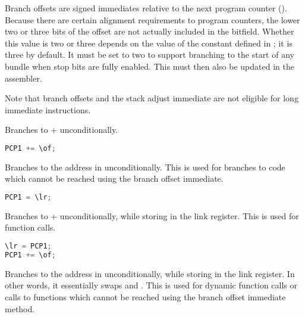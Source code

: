 Branch offsets are signed immediates relative to the next program counter
(). Because there are certain alignment requirements to program
counters, the lower two or three bits of the offset are not actually included
in the bitfield. Whether this value is two or three depends on the value of the
 constant defined in ; it
is three by default. It must be set to two to support branching to the start of
any bundle when stop bits are fully enabled. This must then also be updated in
the assembler.

Note that branch offsets and the stack adjust immediate are not eligible for 
long immediate instructions.

Branches to  + \code{\of} unconditionally.

\begin{lstlisting}[numbers=none, basicstyle=\ttfamily\footnotesize, language=C++]
PCP1 += \of;
\end{lstlisting}

Branches to the address in \code{\lr} unconditionally. This is used for branches 
to code which cannot be reached using the branch offset immediate.

\begin{lstlisting}[numbers=none, basicstyle=\ttfamily\footnotesize, language=C++]
PCP1 = \lr;
\end{lstlisting}

Branches to  + \code{\of} unconditionally, while storing  
in the link register. This is used for function calls.

\begin{lstlisting}[numbers=none, basicstyle=\ttfamily\footnotesize, language=C++]
\lr = PCP1;
PCP1 += \of;
\end{lstlisting}

Branches to the address in \code{\lr} unconditionally, while storing  
in the link register. In other words, it essentially swaps  and 
\code{\lr}. This is used for dynamic function calls or calls to functions which 
cannot be reached using the branch offset immediate method.

